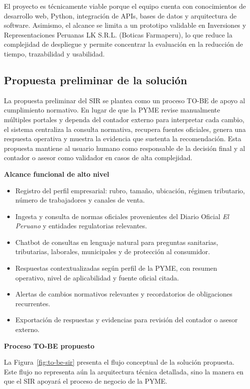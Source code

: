 \documentclass[12pt,a4paper,oneside]{report}
\begin{document}
El proyecto es técnicamente viable porque el equipo cuenta con conocimientos de desarrollo web, Python, integración de APIs, bases de datos y arquitectura de software. Asimismo, el alcance se limita a un prototipo validable en Inversiones y Representaciones Peruanas LK S.R.L. (Boticas Farmaperu), lo que reduce la complejidad de despliegue y permite concentrar la evaluación en la reducción de tiempo, trazabilidad y usabilidad.

\subsection{Propuesta preliminar de la solución}\label{subsec:propuesta-preliminar-solucion}

La propuesta preliminar del SIR se plantea como un proceso TO-BE de apoyo al cumplimiento normativo. En lugar de que la PYME revise manualmente múltiples portales y dependa del contador externo para interpretar cada cambio, el sistema centraliza la consulta normativa, recupera fuentes oficiales, genera una respuesta operativa y muestra la evidencia que sustenta la recomendación. Esta propuesta mantiene al usuario humano como responsable de la decisión final y al contador o asesor como validador en casos de alta complejidad.

\textbf{Alcance funcional de alto nivel}

\begin{itemize}
\item Registro del perfil empresarial: rubro, tamaño, ubicación, régimen tributario, número de trabajadores y canales de venta.
\item Ingesta y consulta de normas oficiales provenientes del Diario Oficial \textit{El Peruano} y entidades regulatorias relevantes.
\item Chatbot de consultas en lenguaje natural para preguntas sanitarias, tributarias, laborales, municipales y de protección al consumidor.
\item Respuestas contextualizadas según perfil de la PYME, con resumen operativo, nivel de aplicabilidad y fuente oficial citada.
\item Alertas de cambios normativos relevantes y recordatorios de obligaciones recurrentes.
\item Exportación de respuestas y evidencias para revisión del contador o asesor externo.
\end{itemize}

\textbf{Proceso TO-BE propuesto}

La Figura~\ref{fig:to-be-sir} presenta el flujo conceptual de la solución propuesta. Este flujo no representa aún la arquitectura técnica detallada, sino la manera en que el SIR apoyará el proceso de negocio de la PYME.
\end{document}
